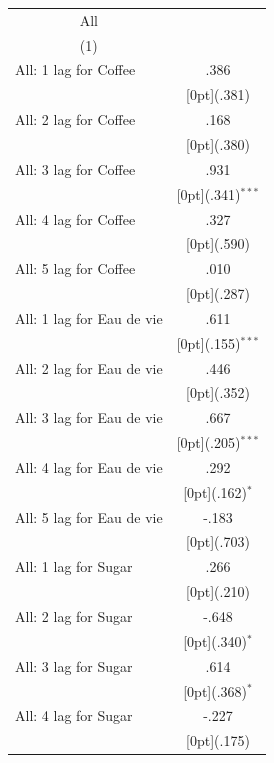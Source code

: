 \documentclass[12pt,a4paper,titlepage]{article}
\begin{document}
{\newpage
{} \label{tab:title} 
\begin{tabular*}{\textwidth}{@{\extracolsep{\fill}}lc}	
	\multicolumn{1}{c}{All} \\
\cline{2-2}	
	\multicolumn{1}{c}{(1)} \\
\hline	
All: 1 lag for Coffee &	.386 \\
&	\raisebox{.7ex}[0pt]{\scriptsize (.381)} \\
All: 2 lag for Coffee &	.168 \\
&	\raisebox{.7ex}[0pt]{\scriptsize (.380)} \\
All: 3 lag for Coffee &	.931 \\
&	\raisebox{.7ex}[0pt]{\scriptsize (.341)$^{***}$} \\
All: 4 lag for Coffee &	.327 \\
&	\raisebox{.7ex}[0pt]{\scriptsize (.590)} \\
All: 5 lag for Coffee &	.010 \\
&	\raisebox{.7ex}[0pt]{\scriptsize (.287)} \\
All: 1 lag for Eau de vie &	.611 \\
&	\raisebox{.7ex}[0pt]{\scriptsize (.155)$^{***}$} \\
All: 2 lag for Eau de vie &	.446 \\
&	\raisebox{.7ex}[0pt]{\scriptsize (.352)} \\
All: 3 lag for Eau de vie &	.667 \\
&	\raisebox{.7ex}[0pt]{\scriptsize (.205)$^{***}$} \\
All: 4 lag for Eau de vie &	.292 \\
&	\raisebox{.7ex}[0pt]{\scriptsize (.162)$^{*}$} \\
All: 5 lag for Eau de vie &	-.183 \\
&	\raisebox{.7ex}[0pt]{\scriptsize (.703)} \\
All: 1 lag for Sugar &	.266 \\
&	\raisebox{.7ex}[0pt]{\scriptsize (.210)} \\
All: 2 lag for Sugar &	-.648 \\
&	\raisebox{.7ex}[0pt]{\scriptsize (.340)$^{*}$} \\
All: 3 lag for Sugar &	.614 \\
&	\raisebox{.7ex}[0pt]{\scriptsize (.368)$^{*}$} \\
All: 4 lag for Sugar &	-.227 \\
&	\raisebox{.7ex}[0pt]{\scriptsize (.175)} \\

\end{tabular*}}
\end{document}
